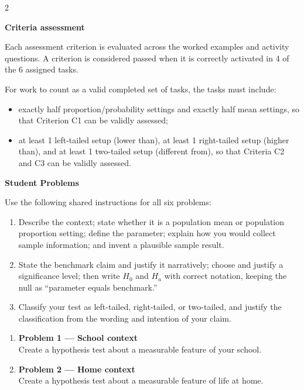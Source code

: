 \documentclass[12pt]{article}
\newcommand{\SubsectionBox}[1]{%
\noindent\colorbox{gray!30}{%
\parbox{\linewidth}{\textbf{#1}}%
}\par\vspace{0.35cm}%
}
\begin{document}
\begin{multicols}{2}
\SubsectionBox{Criteria assessment}\vspace{-0.25cm}
Each assessment criterion is evaluated across the worked examples and activity questions. A criterion is considered passed when it is correctly activated in 4 of the 6 assigned tasks.

For work to count as a valid completed set of tasks, the tasks must include:
\begin{itemize}
	\item exactly half proportion/probability settings and exactly half mean settings, so that Criterion C1 can be validly assessed;
	\item at least 1 left-tailed setup (lower than), at least 1 right-tailed setup (higher than), and at least 1 two-tailed setup (different from), so that Criteria C2 and C3 can be validly assessed.
\end{itemize}


\vspace{0.25cm}
\SubsectionBox{Student Problems}\vspace{-0.25cm}

Use the following shared instructions for all six problems:
\begin{enumerate}
\item[(C1)] Describe the context; state whether it is a population mean or population proportion setting; define the parameter; explain how you would collect sample information; and invent a plausible sample result.
\item[(C2)] State the benchmark claim and justify it narratively; choose and justify a significance level; then write \(H_0\) and \(H_a\) with correct notation, keeping the null as ``parameter equals benchmark.''
\item[(C3)] Classify your test as left-tailed, right-tailed, or two-tailed, and justify the classification from the wording and intention of your claim.
\end{enumerate}

\begin{enumerate}
\item \textbf{Problem 1 --- School context}\\
Create a hypothesis test about a measurable feature of your school.

\item \textbf{Problem 2 --- Home context}\\
Create a hypothesis test about a measurable feature of life at home.


\end{enumerate}
\end{multicols}
\end{document}
